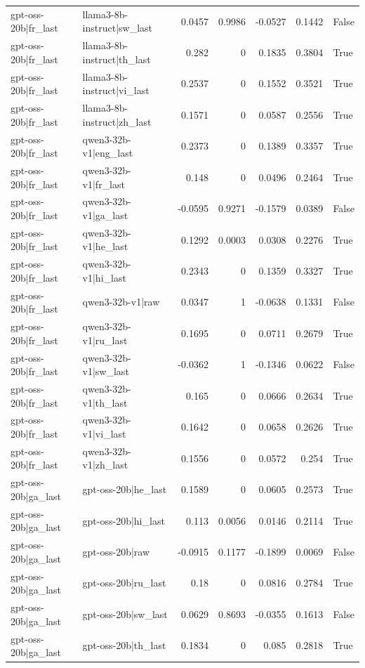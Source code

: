 \begin{table}
\begin{tabular}{l l r r r r l}
gpt-oss-20b|fr_last & llama3-8b-instruct|sw_last & 0.0457 & 0.9986 & -0.0527 & 0.1442 & False \\
gpt-oss-20b|fr_last & llama3-8b-instruct|th_last & 0.282 & 0 & 0.1835 & 0.3804 & True \\
gpt-oss-20b|fr_last & llama3-8b-instruct|vi_last & 0.2537 & 0 & 0.1552 & 0.3521 & True \\
gpt-oss-20b|fr_last & llama3-8b-instruct|zh_last & 0.1571 & 0 & 0.0587 & 0.2556 & True \\
gpt-oss-20b|fr_last & qwen3-32b-v1|eng_last & 0.2373 & 0 & 0.1389 & 0.3357 & True \\
gpt-oss-20b|fr_last & qwen3-32b-v1|fr_last & 0.148 & 0 & 0.0496 & 0.2464 & True \\
gpt-oss-20b|fr_last & qwen3-32b-v1|ga_last & -0.0595 & 0.9271 & -0.1579 & 0.0389 & False \\
gpt-oss-20b|fr_last & qwen3-32b-v1|he_last & 0.1292 & 0.0003 & 0.0308 & 0.2276 & True \\
gpt-oss-20b|fr_last & qwen3-32b-v1|hi_last & 0.2343 & 0 & 0.1359 & 0.3327 & True \\
gpt-oss-20b|fr_last & qwen3-32b-v1|raw & 0.0347 & 1 & -0.0638 & 0.1331 & False \\
gpt-oss-20b|fr_last & qwen3-32b-v1|ru_last & 0.1695 & 0 & 0.0711 & 0.2679 & True \\
gpt-oss-20b|fr_last & qwen3-32b-v1|sw_last & -0.0362 & 1 & -0.1346 & 0.0622 & False \\
gpt-oss-20b|fr_last & qwen3-32b-v1|th_last & 0.165 & 0 & 0.0666 & 0.2634 & True \\
gpt-oss-20b|fr_last & qwen3-32b-v1|vi_last & 0.1642 & 0 & 0.0658 & 0.2626 & True \\
gpt-oss-20b|fr_last & qwen3-32b-v1|zh_last & 0.1556 & 0 & 0.0572 & 0.254 & True \\
gpt-oss-20b|ga_last & gpt-oss-20b|he_last & 0.1589 & 0 & 0.0605 & 0.2573 & True \\
gpt-oss-20b|ga_last & gpt-oss-20b|hi_last & 0.113 & 0.0056 & 0.0146 & 0.2114 & True \\
gpt-oss-20b|ga_last & gpt-oss-20b|raw & -0.0915 & 0.1177 & -0.1899 & 0.0069 & False \\
gpt-oss-20b|ga_last & gpt-oss-20b|ru_last & 0.18 & 0 & 0.0816 & 0.2784 & True \\
gpt-oss-20b|ga_last & gpt-oss-20b|sw_last & 0.0629 & 0.8693 & -0.0355 & 0.1613 & False \\
gpt-oss-20b|ga_last & gpt-oss-20b|th_last & 0.1834 & 0 & 0.085 & 0.2818 & True \\

\end{tabular}
\end{table}
